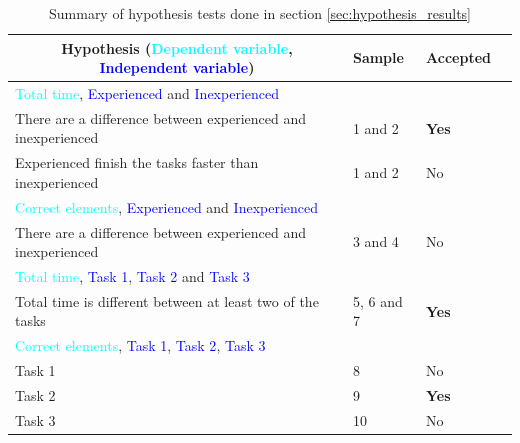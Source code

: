 \begin{table}[H]
	\begin{tabular}{l|l|l|l}
		\multicolumn{1}{c}{Hypothesis (\textcolor{cyan}{Dependent variable}, \textcolor{blue}{Independent variable})} & Sample & Accepted \\[0.2cm] \hline
		\textcolor{cyan}{Total time}, \textcolor{blue}{Experienced} and \textcolor{blue}{Inexperienced} & &  \\
		There are a difference between experienced and inexperienced  & 1 and 2 & \textbf{Yes} \\
		Experienced finish the tasks faster than inexperienced  & 1 and 2 & No   \\ \hline
		\textcolor{cyan}{Correct elements}, \textcolor{blue}{Experienced} and \textcolor{blue}{Inexperienced} & &  \\
		There are a difference between experienced and inexperienced & 3 and 4 & No   \\ \hline
		\textcolor{cyan}{Total time}, \textcolor{blue}{Task 1}, \textcolor{blue}{Task 2} and \textcolor{blue}{Task 3}& &  \\
		 Total time is different between at least two of the tasks & 5, 6 and 7 & \textbf{Yes}   \\ \hline
		\textcolor{cyan}{Correct elements}, \textcolor{blue}{Task 1}, \textcolor{blue}{Task 2}, \textcolor{blue}{Task 3} & &  \\
		Task 1 & 8 & No  \\
		Task 2 & 9 &\textbf{Yes}  \\
		Task 3 & 10 & No  \\ \hline
	\end{tabular}
	\caption[Summary, normality tests]{Summary of hypothesis tests done in section \ref{sec:hypothesis_results}}
	\label{tab:normaltest_summary}
\end{table}
